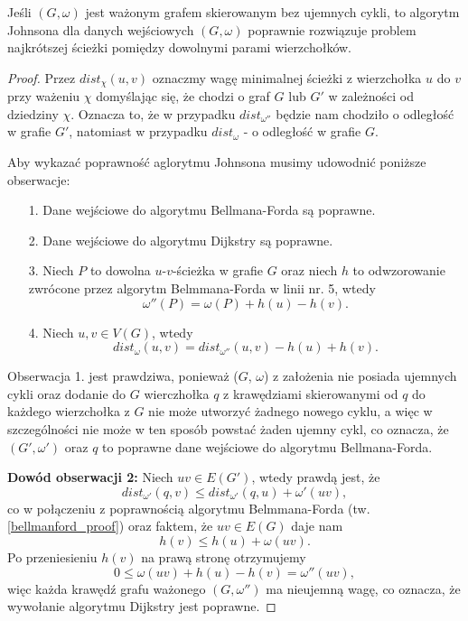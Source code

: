 \begin{theorem}
	Jeśli $(G, \omega)$ jest ważonym grafem skierowanym
	bez ujemnych cykli, to algorytm Johnsona dla 
	danych wejściowych $(G, \omega)$ poprawnie
	rozwiązuje problem najkrótszej ścieżki 
	pomiędzy dowolnymi parami wierzchołków.
	
	\begin{proof}
		Przez $dist_\chi(u, v)$ oznaczmy wagę minimalnej ścieżki
		z wierzchołka $u$ do $v$ przy ważeniu $\chi$ domyślając się, 
		że chodzi o graf $G$ lub $G'$ w zależności od dziedziny $\chi$. Oznacza to, że w przypadku $dist_{\omega''}$ będzie nam chodziło o odległość w grafie $G'$,
		natomiast w przypadku $dist_{\omega}$ - o odległość w grafie $G$.
		
		Aby wykazać poprawność aglorytmu Johnsona 
		musimy udowodnić poniższe obserwacje:
		\begin{itemize}
			\item[1. ] Dane wejściowe do 
			algorytmu Bellmana-Forda są poprawne.
			\item[2. ] Dane wejściowe do 
			algorytmu Dijkstry są poprawne.
			\item[3. ] Niech $P$ to dowolna
			$u$-$v$-ścieżka w grafie $G$ oraz niech $h$
			to odwzorowanie zwrócone przez algorytm
			Belmmana-Forda w linii nr. 5, wtedy
			\[\omega''(P) = \omega(P) +  h(u) - h(v).\]
			\item[4. ] Niech $u, v \in V(G)$, wtedy
			\[dist_{\omega}(u, v) = dist_{\omega''}(u, v) - h(u) + h(v).\]
		\end{itemize}
		
		Obserwacja 1. jest prawdziwa, ponieważ ($G$, $\omega$)
		z założenia nie posiada ujemnych cykli oraz
		dodanie do $G$ wierczhołka $q$ z krawędziami skierowanymi
		od $q$ do każdego wierzchołka z $G$ nie może utworzyć
		żadnego nowego cyklu, a więc w szczególności nie może
		w ten sposób powstać żaden ujemny cykl, co oznacza, że
		$(G', \omega')$ oraz $q$ to poprawne dane wejściowe
		do algorytmu Bellmana-Forda.
		
		\textbf{Dowód obserwacji 2:} Niech $uv \in E(G')$, 
		wtedy prawdą jest, że
		\[dist_{\omega'}(q, v) \leq dist_{\omega'}(q, u) + \omega'(uv),\]
		co w połączeniu z poprawnością algorytmu Belmmana-Forda (tw.
		\ref{bellmanford_proof}) oraz faktem, że 
		$uv \in E(G)$ daje nam
		\[h(v) \leq h(u) + \omega(uv).\]
		Po przeniesieniu $h(v)$ na prawą stronę otrzymujemy 
		\[0 \leq \omega(uv) + h(u) - h(v) = \omega''(uv),\]
		więc każda krawędź grafu ważonego $(G, \omega'')$ ma
		nieujemną wagę, co oznacza, że wywołanie algorytmu 
		Dijkstry jest poprawne.  
		

\end{proof}
\end{theorem}
